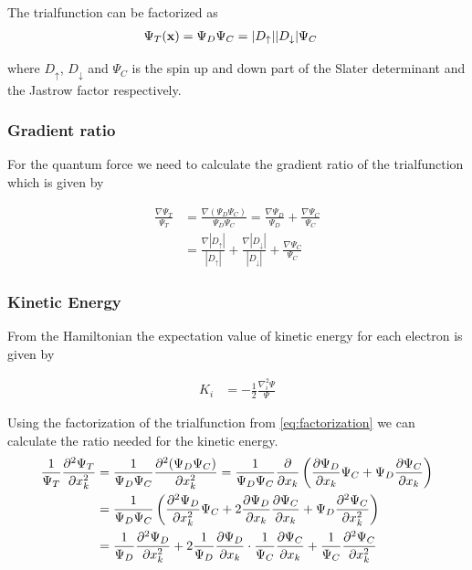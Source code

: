 \documentclass[x11names]{article}
\begin{document}
		The trialfunction can be factorized as
		\begin{align}
			\Psi_T(\vb{x}) &= \Psi_{D} \Psi_C= |D_\uparrow| |D_\downarrow| \Psi_C \label{eq:factorization}
		\end{align}

		where \(D_\uparrow\), \(D_\downarrow\) and \(\Psi_C\) is the spin up and down part of the Slater determinant and the Jastrow factor respectively.

		\subsubsection{Gradient ratio}
			For the quantum force we need to calculate the gradient ratio of the trialfunction which is given by

			\begin{align}
				\frac{\nabla \Psi_T}{ \Psi_T } &= \frac{\nabla( \Psi_D\Psi_C  )}{ \Psi_D\Psi_C } = \frac{ \nabla \Psi_D }{\Psi_D } + \frac{\nabla \Psi_C}{\Psi_C}
				\\
				&= \frac{\nabla |D_\uparrow|}{|D_\uparrow|} + \frac{ \nabla |D_\downarrow|}{|D_\downarrow|} + \frac{\nabla \Psi_C}{\Psi_C}
			\end{align}

		\subsubsection{Kinetic Energy}
			From the Hamiltonian the expectation value of kinetic energy for each electron is given by

			\begin{align}
				K_i &= - \frac{1}{2} \frac{\nabla^2_i \Psi}{\Psi}
			\end{align}

				Using the factorization of the trialfunction from \eqref{eq:factorization} we can calculate the ratio needed for the kinetic energy.
			\begin{align}
				\frac{1}{\Psi_T}\pdv[2]{\Psi_T}{x_k} &= \frac{1}{\Psi_D\Psi_C} \pdv[2]{(\Psi_D\Psi_C)}{x_k} = \frac{1}{\Psi_D\Psi_C} \pdv{}{x_k} \left( \pdv{\Psi_D}{x_k} \Psi_C +\Psi_D \pdv{\Psi_C}{x_k} \right)
				\\
				&= \frac{ 1 }{\Psi_D\Psi_C} \left( \pdv[2]{\Psi_D}{x_k} \Psi_C   + 2 \pdv{ \Psi_D }{x_k}\pdv{ \Psi_C }{x_k} + \Psi_D\pdv[2]{\Psi_C}{x_k} \right)
				\\
				&= \frac{1}{\Psi_D}\pdv[2]{\Psi_D}{x_k}  + 2 \frac{1}{\Psi_D} \pdv{ \Psi_D }{x_k} \cdot \frac{1}{\Psi_C}\pdv{ \Psi_C }{x_k} +  \frac{1}{\Psi_C}\pdv[2]{\Psi_C}{x_k} \label{eq:laplacianIntermediate}
			\end{align}
\end{document}
